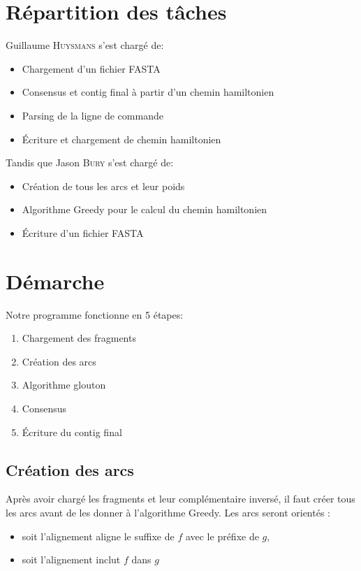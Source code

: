 \documentclass[a4paper, 12pt, titlepage]{article}
\begin{document}



\section{Répartition des tâches}
\noindent Guillaume \textsc{Huysmans} s'est chargé de:
\begin{itemize}
 \item Chargement d'un fichier FASTA
 \item Consensus et contig final à partir d'un chemin hamiltonien
 \item Parsing de la ligne de commande
 \item Écriture et chargement de chemin hamiltonien
\end{itemize}
\noindent Tandis que Jason \textsc{Bury} s'est chargé de:
\begin{itemize}
 \item Création de tous les arcs et leur poids
 \item Algorithme Greedy pour le calcul du chemin hamiltonien
 \item Écriture d'un fichier FASTA
\end{itemize}

\section{Démarche}
Notre programme fonctionne en 5 étapes:
\begin{enumerate}
 \item Chargement des fragments
 \item Création des arcs
 \item Algorithme glouton
 \item Consensus
 \item Écriture du contig final
\end{enumerate}

\subsection{Création des arcs}
Après avoir chargé les fragments et leur complémentaire inversé,
il faut créer tous les arcs avant de les donner à l'algorithme Greedy.
Les arcs seront orientés :
\begin{itemize}
	\item soit l'alignement aligne le suffixe de $f$ avec le préfixe de $g$,
	\item soit l'alignement inclut $f$ dans $g$
\end{itemize}
\end{document}
